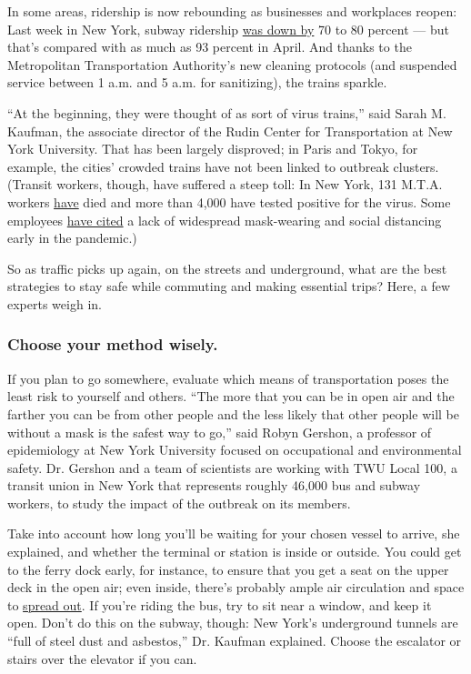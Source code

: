In some areas, ridership is now rebounding as businesses and workplaces
reopen: Last week in New York, subway ridership
\href{https://new.mta.info/coronavirus/ridership}{was down by} 70 to 80
percent --- but that's compared with as much as 93 percent in April. And
thanks to the Metropolitan Transportation Authority's new cleaning
protocols (and suspended service between 1 a.m. and 5 a.m. for
sanitizing), the trains sparkle.

``At the beginning, they were thought of as sort of virus trains,'' said
Sarah M. Kaufman, the associate director of the Rudin Center for
Transportation at New York University. That has been largely disproved;
in Paris and Tokyo, for example, the cities' crowded trains have not
been linked to outbreak clusters. (Transit workers, though, have
suffered a steep toll: In New York, 131 M.T.A. workers
\href{https://www.nytimes.com/interactive/2020/07/26/nyregion/nyc-covid-19-mta-transit-workers.html}{have}
died and more than 4,000 have tested positive for the virus. Some
employees
\href{https://www.nytimes.com/2020/04/08/nyregion/coronavirus-nyc-mta-subway.html}{have
cited} a lack of widespread mask-wearing and social distancing early in
the pandemic.)

So as traffic picks up again, on the streets and underground, what are
the best strategies to stay safe while commuting and making essential
trips? Here, a few experts weigh in.

\hypertarget{choose-your-method-wisely}{%
\subsubsection{Choose your method
wisely.}\label{choose-your-method-wisely}}

If you plan to go somewhere, evaluate which means of transportation
poses the least risk to yourself and others. ``The more that you can be
in open air and the farther you can be from other people and the less
likely that other people will be without a mask is the safest way to
go,'' said Robyn Gershon, a professor of epidemiology at New York
University focused on occupational and environmental safety. Dr. Gershon
and a team of scientists are working with TWU Local 100, a transit union
in New York that represents roughly 46,000 bus and subway workers, to
study the impact of the outbreak on its members.

Take into account how long you'll be waiting for your chosen vessel to
arrive, she explained, and whether the terminal or station is inside or
outside. You could get to the ferry dock early, for instance, to ensure
that you get a seat on the upper deck in the open air; even inside,
there's probably ample air circulation and space to
\href{https://twitter.com/vinbarone/status/1270470612071440386}{spread
out}. If you're riding the bus, try to sit near a window, and keep it
open. Don't do this on the subway, though: New York's underground
tunnels are ``full of steel dust and asbestos,'' Dr. Kaufman explained.
Choose the escalator or stairs over the elevator if you can.

